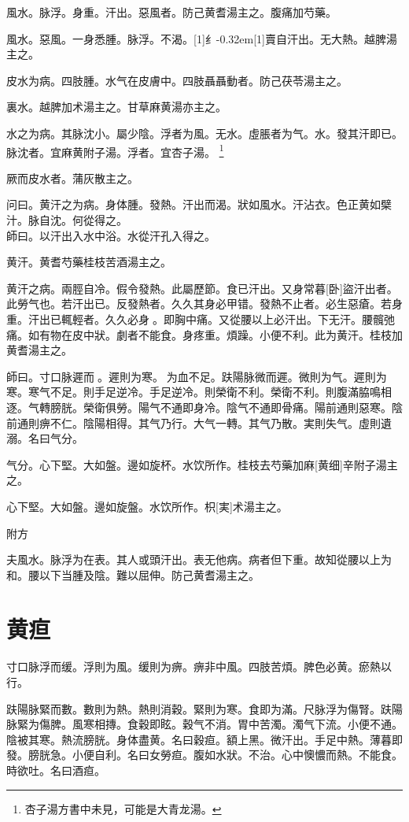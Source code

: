 \documentclass[11pt,oneside,b5paper]{ctexbook}
\begin{document}
\begin{flushleft}
風水。脉浮。身重。汗出。惡風者。防己黄耆湯主之。腹痛加芍藥。

風水。惡風。一身悉腫。脉浮。不渴。{\hbox{\scalebox{0.6}[1]{纟}\kern-0.32em\scalebox{0.7}[1]{賣}}}自汗出。无大熱。越脾湯主之。

皮水为病。四肢腫。水气在皮膚中。四肢聶聶動者。防己茯苓湯主之。

裏水。越脾加术湯主之。甘草麻黄湯亦主之。

水之为病。其脉沈小。屬少陰。浮者为風。无水。虛脹者为气。水。發其汗即已。脉沈者。宜麻黄附子湯。浮者。宜杏子湯。
\footnote{杏子湯方書中未見，可能是大青龙湯。}

厥而皮水者。蒲灰散主之。

问曰。黄汗之为病。身体腫。發熱。汗出而渴。狀如風水。汗沾衣。色正黄如檗汁。脉自沈。何從得之。\\
師曰。以汗出入水中浴。水從汗孔入得之。

黄汗。黄耆芍藥桂枝苦酒湯主之。

黄汗之病。兩脛自冷。假令發熱。此屬歷節。食已汗出。又身常暮[卧]盜汗出者。此勞气也。若汗出已。反發熱者。久久其身必甲错。發熱不止者。必生惡瘡。若身重。汗出已輒輕者。久久必身{𥆧}。即胸中痛。又從腰以上必汗出。下无汗。腰髖弛痛。如有物在皮中狀。劇者不能食。身疼重。煩躁。小便不利。此为黄汗。桂枝加黄耆湯主之。

師曰。寸口脉遲而{𬈧}。遲則为寒。{𬈧}为血不足。趺陽脉微而遲。微則为气。遲則为寒。寒气不足。則手足逆冷。手足逆冷。則榮衛不利。榮衛不利。則腹滿脇鳴相逐。气轉膀胱。榮衛俱勞。陽气不通即身冷。陰气不通即骨痛。陽前通則惡寒。陰前通則痹不仁。陰陽相得。其气乃行。大气一轉。其气乃散。実則失气。虛則遺溺。名曰气分。

气分。心下堅。大如盤。邊如旋杯。水饮所作。桂枝去芍藥加麻[黄细]辛附子湯主之。

心下堅。大如盤。邊如旋盤。水饮所作。枳[実]术湯主之。

附方

夫風水。脉浮为在表。其人或頭汗出。表无他病。病者但下重。故知從腰以上为和。腰以下当腫及陰。難以屈伸。防己黄耆湯主之。

\chapter{黄疸}

寸口脉浮而缓。浮則为風。缓則为痹。痹非中風。四肢苦煩。脾色必黄。瘀熱以行。

趺陽脉緊而數。數則为熱。熱則消穀。緊則为寒。食即为滿。尺脉浮为傷腎。趺陽脉緊为傷脾。風寒相摶。食穀即眩。穀气不消。胃中苦濁。濁气下流。小便不通。陰被其寒。熱流膀胱。身体盡黄。名曰穀疸。額上黑。微汗出。手足中熱。薄暮即發。膀胱急。小便自利。名曰女勞疸。腹如水狀。不治。心中懊憹而熱。不能食。時欲吐。名曰酒疸。


\end{flushleft}
\end{document}
